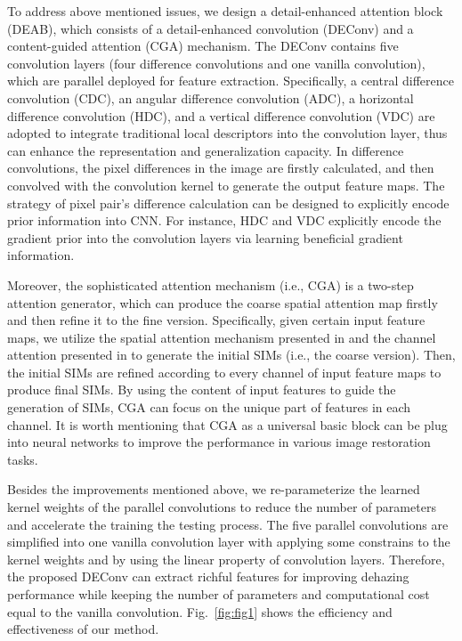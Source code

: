 \documentclass[lettersize,journal]{IEEEtran}
\begin{document}
To address above mentioned issues, we design a detail-enhanced attention block (DEAB), which consists of a detail-enhanced convolution (DEConv) and a content-guided attention (CGA) mechanism.
The DEConv contains five convolution layers (four difference convolutions \cite{Yu2020CVPR-CDC} and one vanilla convolution), which are parallel deployed for feature extraction.
Specifically, a central difference convolution (CDC), an angular difference convolution (ADC), a horizontal difference convolution (HDC), and a vertical difference convolution (VDC) are adopted to integrate traditional local descriptors into the convolution layer, thus can enhance the representation and generalization capacity.
In difference convolutions, the pixel differences in the image are firstly calculated, and then convolved with the convolution kernel to generate the output feature maps.
The strategy of pixel pair's difference calculation can be designed to explicitly encode prior information into CNN.
For instance, HDC and VDC explicitly encode the gradient prior into the convolution layers via learning beneficial gradient information.



Moreover, the sophisticated attention mechanism (i.e., CGA) is a two-step attention generator, which can produce the coarse spatial attention map firstly and then refine it to the fine version.
Specifically, given certain input feature maps, we utilize the spatial attention mechanism presented in \cite{woo2018ECCV} and the channel attention presented in \cite{Hu2018CVPR-SE} to generate the initial SIMs (i.e., the coarse version).
Then, the initial SIMs are refined according to every channel of input feature maps to produce final SIMs.
By using the content of input features to guide the generation of SIMs, CGA can focus on the unique part of features in each channel.
It is worth mentioning that CGA as a universal basic block can be plug into neural networks to improve the performance in various image restoration tasks.

Besides the improvements mentioned above, we re-parameterize the learned kernel weights of the parallel convolutions to reduce the number of parameters and accelerate the training the testing process.
The five parallel convolutions are simplified into one vanilla convolution layer with applying some constrains to the kernel weights and by using the linear property of convolution layers.
Therefore, the proposed DEConv can extract richful features for improving dehazing performance while keeping the number of parameters and computational cost equal to the vanilla convolution.
Fig.~\ref{fig:fig1} shows the efficiency and effectiveness of our method.
\end{document}
